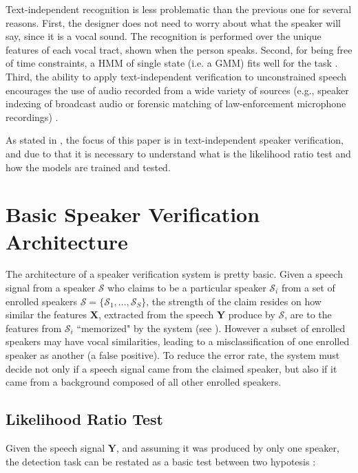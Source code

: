 Text-independent recognition is less problematic than the previous one for several reasons. First, the designer does not need to worry about what the speaker will say, since it is a vocal sound. The recognition is performed over the unique features of each vocal tract, shown when the person speaks. Second, for being free of time constraints, a HMM of single state (i.e. a GMM) fits well for the task \cite{hebert.2008}. Third, the ability to apply text-independent verification to unconstrained speech encourages the use of audio recorded from a wide variety of sources (e.g., speaker indexing of broadcast audio or forensic matching of law-enforcement microphone recordings) \cite{reynolds.campbell.2008}.

As stated in , the focus of this paper is in text-independent speaker verification, and due to that it is necessary to understand what is the likelihood ratio test and how the models are trained and tested.

\section{Basic Speaker Verification Architecture}

The architecture of a speaker verification system is pretty basic. Given a speech signal from a speaker $\mathcal{S}$ who claims to be a particular speaker $\mathcal{S}_i$ from a set of enrolled speakers $\boldsymbol{\mathcal{S}} = \{\mathcal{S}_1, ..., \mathcal{S}_S\}$, the strength of the claim resides on how similar the features $\boldsymbol{X}$, extracted from the speech $\boldsymbol{Y}$ produce by $\mathcal{S}$, are to the features from $\mathcal{S}_i$ ``memorized" by the system (see ). However a subset of enrolled speakers may have vocal similarities, leading to a misclassification of one enrolled speaker as another (a false positive). To reduce the error rate, the system must decide not only if a speech signal came from the claimed speaker, but also if it came from a background composed of all other enrolled speakers.

\subsection{Likelihood Ratio Test}

Given the speech signal $\boldsymbol{Y}$, and assuming it was produced by only one speaker, the detection task can be restated as a basic test between two hypotesis \cite{reynolds.1995b}:

